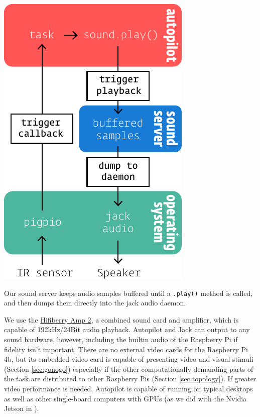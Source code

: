 \begin{marginfigure}[0cm]
\includegraphics[]{figures/side_19_soundpath.pdf}
\caption{Our sound server keeps audio samples buffered until a \texttt{.play()} method is called, and then dumps them directly into the jack audio daemon.}
\label{fig:soundpath}
\end{marginfigure}

We use the \href{https://www.hifiberry.com/shop/boards/hifiberry-amp2/}{Hifiberry Amp 2}, a combined sound card and amplifier, which is capable of 192kHz/24Bit audio playback. Autopilot and Jack can output to any sound hardware, however, including the builtin audio of the Raspberry Pi if fidelity isn't important. There are no external video cards for the Raspberry Pi 4b, but its embedded video card is capable of presenting video and visual stimuli (Section \ref{sec:gonogo}) especially if the other computationally demanding parts of the task are distributed to other Raspberry Pis (Section \ref{sec:topology}). If greater video performance is needed, Autopilot is capable of running on typical desktops as well as other single-board computers with GPUs (as we did with the Nvidia Jetson in \citep{kaneRealtimeLowlatencyClosedloop2020a}).

